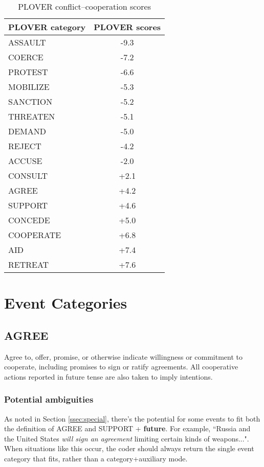 \documentclass[11pt]{report}
\newcommand{\plcat}[1]{\textsf{#1}}
\newcommand{\plcon}[1]{\textbf{#1}}
\begin{document}
\begin{table}[htp]
\begin{center}
\caption{PLOVER conflict--cooperation scores}
\begin{tabular}{lc}
\hline
\textbf{PLOVER category} & \textbf{PLOVER scores} \\
\hline
ASSAULT  & -9.3\\
COERCE & -7.2\\
PROTEST & -6.6\\
MOBILIZE & -5.3\\
SANCTION & -5.2\\
THREATEN & -5.1\\
DEMAND & -5.0\\
REJECT & -4.2\\
ACCUSE &  -2.0\\
CONSULT &  +2.1\\
AGREE & +4.2\\
SUPPORT & +4.6\\
CONCEDE & +5.0\\
COOPERATE & +6.8\\
AID & +7.4\\
RETREAT & +7.6 \\
\hline
\end{tabular}
\end{center}
\label{tab:ploverscores}
\end{table}

\chapter{Event Categories}

\section{AGREE}


Agree to, offer, promise, or otherwise indicate willingness or commitment to cooperate, including promises to sign or ratify agreements.  All cooperative actions reported in future tense are also taken to imply intentions. 


\subsection{Potential ambiguities}

As noted in Section \ref{ssec:special}, there's the potential for some events to fit both the definition of \plcat{AGREE} and \plcat{SUPPORT} + \plcon{future}. For example, ``Russia and the United States \emph{will sign an agreement} limiting certain kinds of weapons...". When situations like this occur, the coder should always return the single event category that fits, rather than a category+auxiliary mode.
\end{document}
